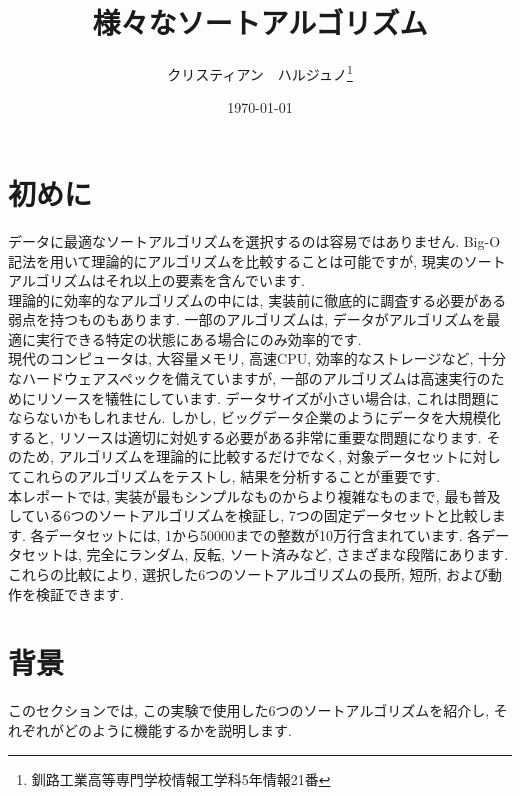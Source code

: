 \documentclass[a4j, 12pt]{jarticle}
\title{様々なソートアルゴリズム}
\author{クリスティアン　ハルジュノ\thanks{釧路工業高等専門学校情報工学科5年情報21番}}
\date{\today}
\begin{document}
\maketitle
\section{初めに}
データに最適なソートアルゴリズムを選択するのは容易ではありません. Big-O記法を用いて理論的にアルゴリズムを比較することは可能ですが, 現実のソートアルゴリズムはそれ以上の要素を含んでいます. \\

理論的に効率的なアルゴリズムの中には, 実装前に徹底的に調査する必要がある弱点を持つものもあります. 一部のアルゴリズムは, データがアルゴリズムを最適に実行できる特定の状態にある場合にのみ効率的です. \\

現代のコンピュータは, 大容量メモリ, 高速CPU, 効率的なストレージなど, 十分なハードウェアスペックを備えていますが, 一部のアルゴリズムは高速実行のためにリソースを犠牲にしています. データサイズが小さい場合は, これは問題にならないかもしれません. しかし, ビッグデータ企業のようにデータを大規模化すると, リソースは適切に対処する必要がある非常に重要な問題になります. そのため, アルゴリズムを理論的に比較するだけでなく, 対象データセットに対してこれらのアルゴリズムをテストし, 結果を分析することが重要です. \\

本レポートでは, 実装が最もシンプルなものからより複雑なものまで, 最も普及している6つのソートアルゴリズムを検証し, 7つの固定データセットと比較します. 各データセットには, 1から50000までの整数が10万行含まれています. 各データセットは, 完全にランダム, 反転, ソート済みなど, さまざまな段階にあります. これらの比較により, 選択した6つのソートアルゴリズムの長所, 短所, および動作を検証できます. \\
\section{背景}
このセクションでは, この実験で使用した6つのソートアルゴリズムを紹介し, それぞれがどのように機能するかを説明します.
\end{document}
